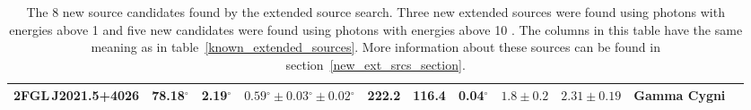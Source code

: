 \documentclass[12pt,preprint]{aastex}
\newcommand{\gev}{\text{GeV}\xspace}
\renewcommand{\deg}{\ensuremath{^\circ}\xspace}
\begin{document}
\begin{table}
\begin{centering}
\begin{tabular}{l|rrlrrrrrrr}
      2FGL\,J2021.5+4026   &      78.18\deg &       2.19\deg & $  0.59\deg \pm   0.03\deg \pm   0.02\deg $ &      222.2 &      116.4 &   0.04\deg & $    1.8 \pm     0.2$ & $   2.31 \pm    0.19$ &          Gamma Cygni \\
      \hline
  \end{tabular}
    \caption{The 8 new source candidates found by the extended source
    search. Three new extended sources were found using photons with
    energies above 1 \gev and five new candidates were found using
    photons with energies above 10 \gev.  The columns in this table
    have the same meaning as in table~\ref{known_extended_sources}.
    More information about these sources can be found in
    section~\ref{new_ext_srcs_section}.
    }
    \label{new_ext_srcs_table}
  \end{centering}
\end{table}
\end{document}
